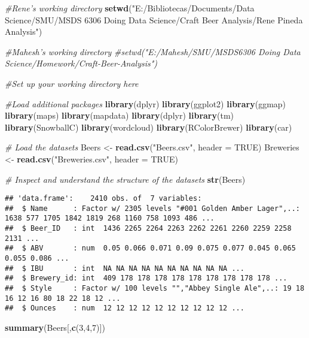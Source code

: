 \documentclass[]{article}
\newenvironment{Shaded}{\begin{snugshade}}{\end{snugshade}}
\newcommand{\KeywordTok}[1]{\textcolor[rgb]{0.13,0.29,0.53}{\textbf{{#1}}}}
\newcommand{\DataTypeTok}[1]{\textcolor[rgb]{0.13,0.29,0.53}{{#1}}}
\newcommand{\DecValTok}[1]{\textcolor[rgb]{0.00,0.00,0.81}{{#1}}}
\newcommand{\StringTok}[1]{\textcolor[rgb]{0.31,0.60,0.02}{{#1}}}
\newcommand{\CommentTok}[1]{\textcolor[rgb]{0.56,0.35,0.01}{\textit{{#1}}}}
\newcommand{\OtherTok}[1]{\textcolor[rgb]{0.56,0.35,0.01}{{#1}}}
\newcommand{\NormalTok}[1]{{#1}}
\begin{document}
\begin{Shaded}
\begin{Highlighting}[]
\CommentTok{#Rene's working directory}
\KeywordTok{setwd}\NormalTok{(}\StringTok{"E:/Bibliotecas/Documents/Data Science/SMU/MSDS 6306 Doing Data Science/Craft Beer Analysis/Rene Pineda Analysis"}\NormalTok{)}

\CommentTok{#Mahesh's working directory}
\CommentTok{#setwd("E:/Mahesh/SMU/MSDS6306 Doing Data Science/Homework/Craft-Beer-Analysis")}

\CommentTok{#Set up your working directory here}

\CommentTok{#Load additional packages}
\KeywordTok{library}\NormalTok{(dplyr)}
\KeywordTok{library}\NormalTok{(ggplot2)}
\KeywordTok{library}\NormalTok{(ggmap)}
\KeywordTok{library}\NormalTok{(maps)}
\KeywordTok{library}\NormalTok{(mapdata)}
\KeywordTok{library}\NormalTok{(dplyr)}
\KeywordTok{library}\NormalTok{(tm)}
\KeywordTok{library}\NormalTok{(SnowballC)}
\KeywordTok{library}\NormalTok{(wordcloud)}
\KeywordTok{library}\NormalTok{(RColorBrewer)}
\KeywordTok{library}\NormalTok{(car)}
     
\CommentTok{# Load the datasets}
\NormalTok{Beers <-}\StringTok{ }\KeywordTok{read.csv}\NormalTok{(}\StringTok{"Beers.csv"}\NormalTok{, }\DataTypeTok{header =} \OtherTok{TRUE}\NormalTok{)}
\NormalTok{Breweries <-}\StringTok{ }\KeywordTok{read.csv}\NormalTok{(}\StringTok{"Breweries.csv"}\NormalTok{, }\DataTypeTok{header =} \OtherTok{TRUE}\NormalTok{)}

\CommentTok{# Inspect and understand the structure of the datasets}
\KeywordTok{str}\NormalTok{(Beers)}
\end{Highlighting}
\end{Shaded}

\begin{verbatim}
## 'data.frame':    2410 obs. of  7 variables:
##  $ Name      : Factor w/ 2305 levels "#001 Golden Amber Lager",..: 1638 577 1705 1842 1819 268 1160 758 1093 486 ...
##  $ Beer_ID   : int  1436 2265 2264 2263 2262 2261 2260 2259 2258 2131 ...
##  $ ABV       : num  0.05 0.066 0.071 0.09 0.075 0.077 0.045 0.065 0.055 0.086 ...
##  $ IBU       : int  NA NA NA NA NA NA NA NA NA NA ...
##  $ Brewery_id: int  409 178 178 178 178 178 178 178 178 178 ...
##  $ Style     : Factor w/ 100 levels "","Abbey Single Ale",..: 19 18 16 12 16 80 18 22 18 12 ...
##  $ Ounces    : num  12 12 12 12 12 12 12 12 12 12 ...
\end{verbatim}

\begin{Shaded}
\begin{Highlighting}[]
\KeywordTok{summary}\NormalTok{(Beers[,}\KeywordTok{c}\NormalTok{(}\DecValTok{3}\NormalTok{,}\DecValTok{4}\NormalTok{,}\DecValTok{7}\NormalTok{)])}
\end{Highlighting}
\end{Shaded}
\end{document}
